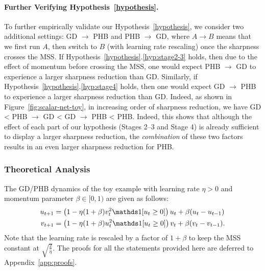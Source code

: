\paragraph{Further Verifying Hypothesis~\ref{hypothesis}.}
To further empirically validate our Hypothesis~\ref{hypothesis}, we consider two additional settings: {\color{darkgreen} GD $\to$ PHB} and {\color{red} PHB $\to$ GD}, where $A \to B$ means that we first run $A$, then switch to $B$ (with learning rate rescaling) once the sharpness crosses the MSS.
If Hypothesis~\ref{hypothesis}.\ref{hyp:stage2-3} holds, then due to the effect of momentum before crossing the MSS, one would expect {\color{red} PHB $\to$ GD} to experience a larger sharpness reduction than {\color{blue} GD}.
Similarly, if Hypothesis~\ref{hypothesis}.\ref{hyp:stage4} holds, then one would expect {\color{darkgreen} GD $\to$ PHB} to experience a larger sharpness reduction than {\color{blue} GD}.
Indeed, as shown in Figure~\ref{fig:scalar-net-toy}, in increasing order of sharpness reduction, we have {\color{blue} GD} < {\color{red} PHB $\to$ GD} < {\color{darkgreen} GD $\to$ PHB} < {\color{orange} PHB}. Indeed, this shows that although the effect of each part of our hypothesis (Stages 2--3 and Stage 4) is already sufficient to display a larger sharpness reduction, the \emph{combination} of these two factors results in an even larger sharpness reduction for {\color{orange} PHB}.


\subsubsection{Theoretical Analysis}
The GD/PHB dynamics of the toy example with learning rate $\eta > 0$ and momentum parameter $\beta \in [0, 1)$ are given as follows:
\begin{align*}
    u_{t+1} &= \left( 1 - \eta (1 + \beta) v_t^2 \indicator[u_t \geq 0] \right) u_t + \beta(u_t - u_{t-1}) \\
    v_{t+1} &= \left( 1 - \eta (1 + \beta) u_t^2 \indicator[u_t \geq 0] \right) v_t + \beta(v_t - v_{t-1}).
\end{align*}
Note that the learning rate is rescaled by a factor of $1 + \beta$ to keep the MSS constant at $\sqrt{\frac{2}{\eta}}$.
The proofs for all the statements provided here are deferred to Appendix~\ref{app:proofs}.

